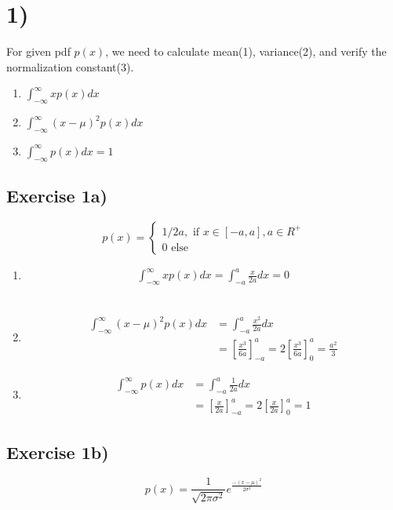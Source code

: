 \section*{1)} %
\label{sec:1}
For given pdf $p(x)$, we need to calculate mean(1), variance(2), and verify the normalization constant(3). 
\begin{enumerate}
	\item $ \int_{-\infty}^{\infty}xp(x)dx$ \\
	\item $  \int_{-\infty}^{\infty}(x-\mu)^2p(x)dx$ \\
	\item $ \int_{-\infty}^{\infty}p(x)dx=1$\\
\end{enumerate}

\subsection*{Exercise 1a)} %
\label{subsection:Exercise 1a)}
\[
p(x)=
\begin{cases}
1/2a, \text{ if } x \in [-a, a], a \in	 R^+ \\
0 \text{ else } 
\end{cases}
\]
\begin{enumerate}
	\item \begin{align*} \int_{-\infty}^{\infty}xp(x)dx = \int_{-a}^{a}\frac{x}{2a}dx=0 
	\end{align*}	 \\
	\item 
	\begin{align*} 
		 \int_{-\infty}^{\infty}(x-\mu)^2p(x)dx &=  \int_{-a}^{a}\frac{x^2}{2a}dx \\ &= [\frac{x^3}{6a}]_{-a}^{a} = 2[\frac{x^3}{6a}]_{0}^{a} = \frac{a^2}{3}
	\end{align*} 
	\item 
	\begin{align*}   \int_{-\infty}^{\infty}p(x)dx &=  \int_{-a}^{a}\frac{1}{2a}dx \\ &= [\frac{x}{2a}]_{-a}^{a} = 2[\frac{x}{2a}]_{0}^{a} = 1
	\end{align*}
\end{enumerate}

\newpage
\subsection*{Exercise 1b)} %
\label{subsection:Exercise 1b)}
\[
p(x)= \frac{1}{\sqrt{2\pi\sigma^2}}e^\frac{-(x-\mu)^2}{2\sigma^2}
\]
	
